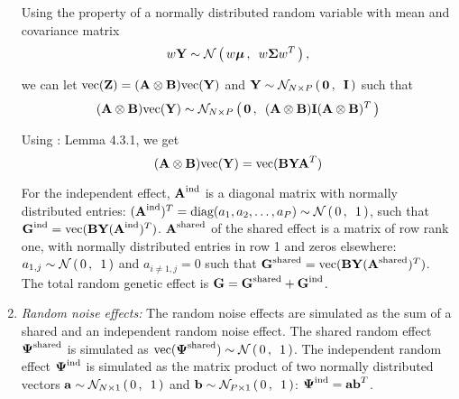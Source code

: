 \begin{enumerate}
Using the property of a normally distributed random variable  with mean \tmat{\mu} and covariance matrix \tmat{\Sigma}
\begin{equation}
\begin{aligned} 
w \boldsymbol{\mathbf{Y}} \sim \mathcal{N}\left(\, {w\boldsymbol{\mathbf{\mu}}} \,,\,~{w\boldsymbol{\mathbf{\Sigma}} w^T} \,\right),
\end{aligned}
\end{equation}

we can let  \(\text{vec} (\boldsymbol{\mathbf{Z}}) =  (\boldsymbol{\mathbf{A}} \otimes \boldsymbol{\mathbf{B}}) \text{vec} (\boldsymbol{\mathbf{Y}})\)  and \(\boldsymbol{\mathbf{Y}} \sim \mathcal{N}_{N\times P}\left(\, {\boldsymbol{\mathbf{0}}} \,,\,~{\boldsymbol{\mathbf{I}}} \,\right)\) such that
\begin{equation}
\begin{aligned}
(\boldsymbol{\mathbf{A}} \otimes\boldsymbol{\mathbf{B}}) \text{vec} (\boldsymbol{\mathbf{Y}})  \sim \mathcal{N}_{N\times P}\left(\, {\boldsymbol{\mathbf{0}}} \,,\,~{(\boldsymbol{\mathbf{A}} \otimes \boldsymbol{\mathbf{B}}) \boldsymbol{\mathbf{I}} (\boldsymbol{\mathbf{A}} \otimes \boldsymbol{\mathbf{B}})^T} \,\right)
\end{aligned}
\end{equation}

Using \citep{Horn1991}: Lemma 4.3.1, we get 
\begin{equation}
(\boldsymbol{\mathbf{A}} \otimes \boldsymbol{\mathbf{B}}) \text{vec}(\boldsymbol{\mathbf{Y}}) = \text{vec}(\boldsymbol{\mathbf{BYA}}^T) 
\end{equation}

For the independent effect, \(\boldsymbol{\mathbf{A}}^{\text{ind}}\) is a diagonal matrix with normally distributed entries: \((\boldsymbol{\mathbf{A}}^{\text{ind}})^T = \text{diag}(a_1, a_2,  \dotsc , a_P) \sim \mathcal{N}\left(\, {0} \,,\,~{1} \,\right)\), such that \(\boldsymbol{\mathbf{G}}^{\text{ind}} =  \text{vec}(\boldsymbol{\mathbf{BY}}(\boldsymbol{\mathbf{A}}^{\text{ind}})^T) \). \(\boldsymbol{\mathbf{A}}^{\text{shared}}\) of the shared effect is a matrix of row rank one, with normally distributed entries in row 1 and zeros elsewhere: \(a_{1,j} \sim \mathcal{N}\left(\, {0} \,,\,~{1} \,\right)\) and \(a_{i \neq 1,j} = 0\) such that \(\boldsymbol{\mathbf{G}}^{\text{shared}} =  \text{vec}(\boldsymbol{\mathbf{BY}}(\boldsymbol{\mathbf{A}}^{\text{shared}})^T) \). The total random genetic effect  is \(\boldsymbol{\mathbf{G}} = \boldsymbol{\mathbf{G}}^{\text{shared}} + \boldsymbol{\mathbf{G}}^{\text{ind}}\). 

\item \textit{Random noise effects:} The random noise effects \tmat{\Psi} are simulated as the sum of a shared and an independent random noise effect. The shared random effect \(\boldsymbol{\mathbf{\Psi}}^{\text{shared}}\) is simulated as \(\text{vec}(\boldsymbol{\mathbf{\Psi}}^{\text{shared}}) \sim \mathcal{N}\left(\, {0} \,,\,~{1} \,\right)\). The independent random effect \(\boldsymbol{\mathbf{\Psi}}^{\text{ind}}\) is simulated as the matrix product of two normally distributed vectors \(\boldsymbol{\mathbf{a}} \sim \mathcal{N}_{N\times 1}\left(\, {0} \,,\,~{1} \,\right)\) and \(\boldsymbol{\mathbf{b}} \sim \mathcal{N}_{P\times 1}\left(\, {0} \,,\,~{1} \,\right)\): \(\boldsymbol{\mathbf{\Psi}}^{\text{ind}} = \boldsymbol{\mathbf{ab}}^T\).



\end{enumerate}
